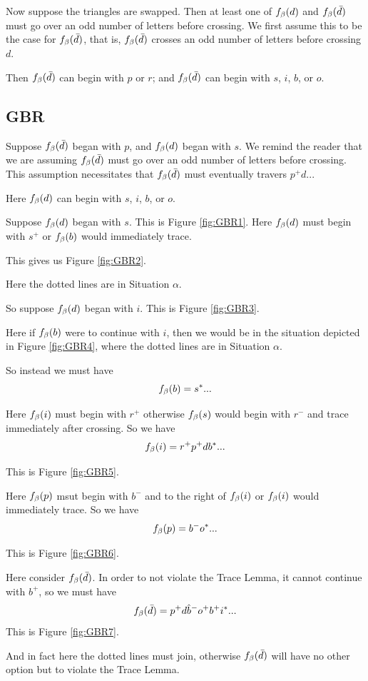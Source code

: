 Now suppose the triangles are swapped. Then at least one of $f_\beta(d)$ and $f_\beta(\bar{d})$ must go over an odd number of letters before crossing. We first assume this to be the case for $f_\beta(\bar{d})$, that is, $f_\beta(\bar{d})$ crosses an odd number of letters before crossing $d$.

Then $f_\beta(\bar{d})$ can begin with $p$ or $r$; and $f_\beta(\bar{d})$ can begin with $s$, $i$, $b$, or $o$.


\subsection{GBR}\label{GBR}
Suppose $f_\beta(\bar{d})$ began with $p$, and $f_\beta(d)$ began with $s$.
We remind the reader that we are assuming $f_\beta(\bar{d})$ must go over an odd number of letters before crossing. This assumption necessitates that $f_\beta(\bar{d})$ must eventually travers $p^+ d...$

Here $f_\beta(d)$ can begin with $s$, $i$, $b$, or $o$.

Suppose $f_\beta(d)$ began with $s$. This is Figure \ref{fig:GBR1}. Here $f_\beta(d)$ must begin with $s^+$ or $f_\beta(b)$ would immediately trace.

This gives us Figure \ref{fig:GBR2}.

Here the dotted lines are in Situation $\alpha$.

So suppose $f_\beta(d)$ began with $i$. This is Figure \ref{fig:GBR3}.

Here if $f_\beta(b)$ were to continue with $i$, then we would be in the situation depicted in Figure \ref{fig:GBR4}, where the dotted lines are in Situation $\alpha$.

So instead we must have
\[
f_\beta(b) = s^*...
\]

Here $f_\beta(i)$ must begin with $r^+$ otherwise $f_\beta(s)$ would begin with $r^-$ and trace immediately after crossing. So we have
\[
f_\beta(i) = r^+ p^+ d b^*...
\]

This is Figure \ref{fig:GBR5}.

Here $f_\beta(p)$ msut begin with $b^-$ and to the right of $f_\beta(i)$ or $f_\beta(i)$ would immediately trace. So we have
\[
f_\beta(p) = b^- o^*...
\]

This is Figure \ref{fig:GBR6}.

Here consider $f_\beta(\bar{d})$. In order to not violate the Trace Lemma, it cannot continue with $b^+$, so we must have
\[
f_\beta(\bar{d}) = p^+ d \hat{b}^- o^+ b^+ i^*...
\]
This is Figure \ref{fig:GBR7}.

And in fact here the dotted lines must join, otherwise $f_\beta(\bar{d})$ will have no other option but to violate the Trace Lemma.

